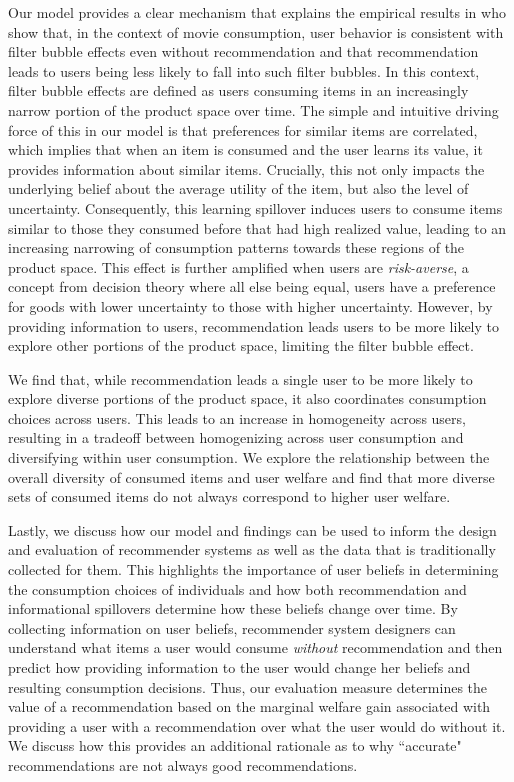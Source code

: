 \documentclass[format=acmsmall, review=false]{acmart}
\newcommand{\xhdr}[1]{\vspace{1mm} \noindent{\bf #1}}
\begin{document}
\xhdr{Our Contributions}
Our model provides a clear mechanism that explains the empirical results in \cite{nguyen2014exploring} who show that, in the context of movie consumption, user behavior is consistent with filter bubble effects even without recommendation and that recommendation leads to users being less likely to fall into such filter bubbles. In this context, filter bubble effects are defined as users consuming items in an increasingly narrow portion of the product space over time. The simple and intuitive driving force of this in our model is that preferences for similar items are correlated, which implies that when an item is consumed and the user learns its value, it provides information about similar items. Crucially, this not only impacts the underlying belief about the average utility of the item, but also the level of uncertainty. Consequently, this learning spillover induces users to consume items similar to those they consumed before that had high realized value, leading to an increasing narrowing of consumption patterns towards these regions of the product space. This effect is further amplified when users are \textit{risk-averse}, a concept from decision theory where all else being equal, users have a preference for goods with lower uncertainty to those with higher uncertainty. However, by providing information to users, recommendation leads users to be more likely to explore other portions of the product space, limiting the filter bubble effect.
\par
We find that, while recommendation leads a single user to be more likely to explore diverse portions of the product space, it also coordinates consumption choices across users. This leads to an increase in homogeneity across users, resulting in a tradeoff between homogenizing across user consumption and diversifying within user consumption. We explore the relationship between the overall diversity of consumed items and user welfare and find that more diverse sets of consumed items do not always correspond to higher user welfare. 
\par
Lastly, we discuss how our model and findings can be used to inform the design and evaluation of recommender systems as well as the data that is traditionally collected for them. This highlights the importance of user beliefs in determining the consumption choices of individuals and how both recommendation and informational spillovers determine how these beliefs change over time. By collecting information on user beliefs, recommender system designers can understand what items a user would consume \textit{without} recommendation and then predict how providing information to the user would change her beliefs and resulting consumption decisions. Thus,  our evaluation measure determines the value of a recommendation based on the marginal welfare gain associated with providing a user with a recommendation over what the user would do without it. We discuss how this provides an additional rationale as to why ``accurate" recommendations are not always good recommendations.
\par
\end{document}
